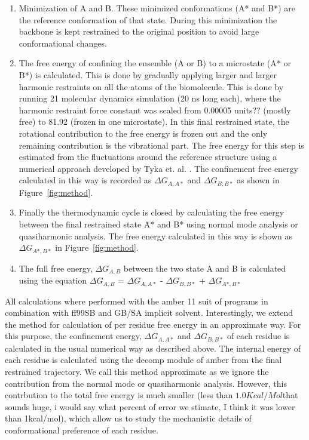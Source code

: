 \documentclass[12pt]{article}
\newcommand{\Alberto}[1]{\color{ForestGreen}#1\normalcolor }
\begin{document}
\begin{enumerate}

\item  Minimization of A and B. These minimized conformations (A* and B*)
       are the reference conformation of that state. During this minimization the backbone is kept
       restrained to the original position to avoid large conformational changes.

   \item  The free energy of confining the ensemble (A or B) to a microstate (A* or B*) is
       calculated. This is done by gradually applying larger and larger
       harmonic restraints on all the atoms of the biomolecule. This is done by running 21 molecular dynamics simulation 
       (20 ns long each), where the harmonic restraint force constant was scaled from 0.00005
       \Alberto{units??}
       (mostly free) to 81.92 (frozen in one microstate). In this final restrained state, the
       rotational contribution to the free energy is frozen out
       and the only remaining contribution is the vibrational part. The free energy for this step is
       estimated from the fluctuations around
       the reference structure using a numerical
       approach developed by Tyka et. al. \cite{Tyka2006}. The confinement free energy calculated in
       this way is recorded as 
       $\Delta G_{A,A*}$ and $\Delta G_{B,B*}$ as shown in Figure~\ref{fig:method}.     

\item  Finally the thermodynamic cycle is closed by calculating the free energy between the final
       restrained state A* and B* using normal mode analysis or quasiharmonic analysis. The free energy calculated in 
       this way is shown as $\Delta G_{A*,B*}$ in Figure~\ref{fig:method}.

\item  The full free energy, $\Delta G_{A,B}$ between the two state A and B is calculated using the equation 
       $\Delta G_{A,B}$ = $\Delta G_{A,A*}$ - $\Delta G_{B,B*}$ + $\Delta G_{A*,B*}$  

\end{enumerate}

All calculations where performed with the amber 11 suit of programs in combination with ff99SB and
GB/SA implicit solvent. Interestingly, we extend the method for calculation of per residue free
energy in an approximate way. For this purpose, the confinement energy, $\Delta G_{A,A*}$ and
$\Delta G_{B,B*}$ of each residue is calculated in the usual numerical way as described above. The
internal energy of each residue is calculated using the decomp module of amber from the final
restrained trajectory. We call this method approximate as we ignore the contribution from the normal
mode or quasiharmonic analysis. However, this contrbution to the total free energy is much smaller
(less than $1.0 Kcal/Mol$\Alberto{that sounds huge, i would say what percent of error we stimate, I
think it was lower than 1kcal/mol}), which allow us to study the mechanistic details of
conformational preference of each residue.      
\end{document}
